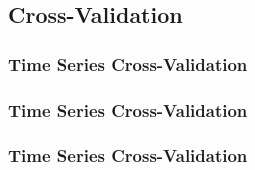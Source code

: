 \documentclass{beamer}
\begin{document}
\subsection{Cross-Validation}
\begin{frame}
  \frametitle{Time Series Cross-Validation}
  \end{frame}

\begin{frame}
  \frametitle{Time Series Cross-Validation}
  \end{frame}

\begin{frame}
  \frametitle{Time Series Cross-Validation}
  \end{frame}
\end{document}
